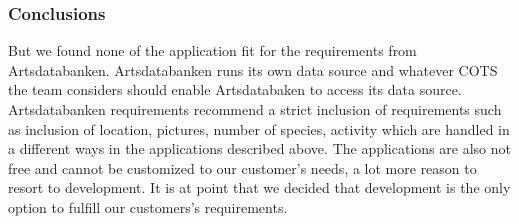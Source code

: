 \subsubsection{Conclusions}
But we found none of the application fit for the requirements from Artsdatabanken. Artsdatabanken runs its own data source and whatever COTS the team considers should enable Artsdatabaken to access its data source. Artsdatabanken requirements recommend a strict inclusion of requirements such as inclusion of location, pictures, number of species, activity which are handled in a different ways in the applications described above. The applications are also not free and  cannot be customized to our customer's needs, a lot more reason to resort to development. It is at point that we decided that development is the only option to fulfill our customers's requirements.

